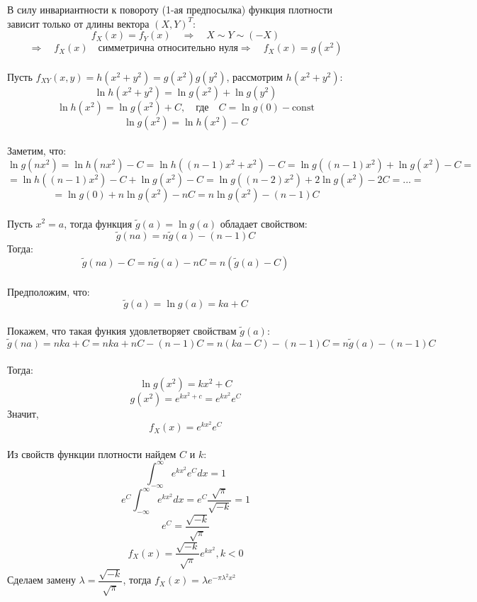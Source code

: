 \documentclass[12pt,a4paper]{article}
\begin{document}
В силу инвариантности к повороту (1-ая предпосылка) функция плотности зависит только от длины вектора $(X, Y)^T$:
\[f_X(x)=f_Y(x) \quad \Rightarrow \quad X \sim Y \sim (-X)  \]
\[\Rightarrow \quad f_X(x) \quad \text{симметрична относительно нуля} \Rightarrow \quad f_X(x)=g(x^2) \]
\vspace{0.05 in} 
\\
Пусть $f_{XY}(x,y)=h(x^2+y^2)=g(x^2)g(y^2)$, рассмотрим $h(x^2+y^2)$:
\[ \ln h(x^2+y^2)= \ln g(x^2)+\ln g(y^2)\]
\[\ln h(x^2) = \ln g(x^2) + C, \quad \text{где} \quad C=\ln g(0)-\text{const} \]
\[ \ln g(x^2) = \ln h(x^2) - C\]
\vspace{0.05 in} 
\\
Заметим, что:
\[ \ln g(nx^2) = \ln h(nx^2) - C= \ln h ((n-1)x^2+x^2) - C = \ln g ((n-1)x^2)+  \ln g(x^2) - C =\]
\[= \ln h((n-1)x^2) - C + \ln g(x^2) - C = \ln g((n-2)x^2) + 2\ln g(x^2) - 2C = ...=\]
\[=\ln g(0) + n\ln g(x^2)-nC=n\ln g(x^2)-(n-1)C\]
\vspace{0.05 in} 
\\
Пусть $x^2=a$, тогда функция $\tilde{g}(a)=\ln g(a)$ обладает свойством:
\[\tilde{g}(na)=n\tilde{g}(a)-(n-1)C\]
Тогда:
\[\tilde{g}(na)-C=n\tilde{g}(a)-nC=n(\tilde{g}(a)-C)\]
\vspace{0.05 in} 
\\
Предположим, что:
\[\tilde{g}(a)=\ln g(a) =ka + C\]
\vspace{0.05 in} 
\\
Покажем, что такая функия удовлетворяет свойствам $\tilde{g}(a)$:
\[\tilde{g}(na)=nka+C=nka+nC-(n-1)C=n(ka-C)-(n-1)C=n\tilde{g}(a)-(n-1)C\]
\vspace{0.05 in} 
\\
Тогда:
\[ \ln g(x^2) = kx^2+C\]
\[g(x^2)=e^{kx^2+c}=e^{kx^2}e^C\]
Значит,
\[f_X(x)=e^{kx^2}e^C\]
\vspace{0.05 in} 
\\
Из свойств функции плотности найдем $C$ и $k$:
\[\displaystyle \int_{-\infty}^{\infty} e^{kx^2}e^C dx= 1\]
\[e^C \displaystyle \int_{-\infty}^{\infty} e^{kx^2} dx= e^C \dfrac{\sqrt{\pi}}{\sqrt{-k}}=1 \]
\[e^C = \dfrac{\sqrt{-k}}{\sqrt{\pi}}\]
\[f_X(x)=\dfrac{\sqrt{-k}}{\sqrt{\pi}} e^{kx^2}, k<0\]
Сделаем замену $\lambda = \dfrac{\sqrt{-k}}{\sqrt{\pi}}$, тогда $f_X(x)=\lambda e^{-\pi{\lambda}^2x^2}$
\vspace{0.4 in} 
\\

\begin{tikzpicture}
	
\end{tikzpicture}
\end{document}

